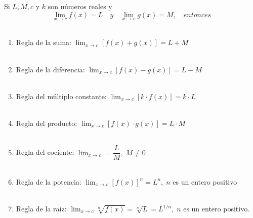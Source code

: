 \begin{tcolorbox}[colframe=white]
\begin{teo} Si $L,M,c$ y $k$ son números reales y $$\lim_{x\to c} f(x) = L \quad y \quad \lim_{x\to c} g(x) = M, \quad entonces$$\\
\begin{enumerate}[\bfseries 1.]
    
    \item Regla de la suma: $\displaystyle\lim_{x\to c} \left[f(x)+g(x)\right]=L+M$\\\\

    \item Regla de la diferencia: $\displaystyle\lim_{x\to c} \left[f(x)-g(x)\right] = L-M$\\\\

    \item Regla del múltiplo constante: $\displaystyle\lim_{x\to c} \left[k\cdot f(x)\right] = k\cdot L$\\\\

    \item Regla del producto: $\displaystyle\lim_{x\to c} \left[f(x)\cdot g(x)\right] = L\cdot M$\\\\

    \item Regla del cociente: $\displaystyle\lim_{x\to c} = \dfrac{L}{M}, \; M\neq 0$\\\\

    \item Regla de la potencia: $\displaystyle\lim_{x\to c} \left[f(x)\right]^n = L^n, \;n$ es un entero positivo\\\\

    \item Regla de la raíz: $\displaystyle\lim_{x\to c} \sqrt[n]{f(x)} = \sqrt[n]{L} = L^{1/n}, \; n$ es un entero positivo.\\\\

\end{enumerate}
\end{teo}
\end{tcolorbox}

